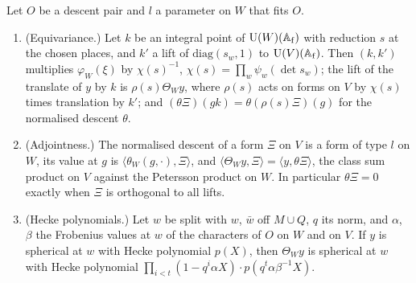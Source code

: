 \begin{proposition}\label{prop:lift-descent}
Let $O$ be a descent pair and $l$ a parameter on $W$ that fits $O$.
\begin{enumerate}[label=\textup{(\alph*)}]
\item (Equivariance.) Let $k$ be an integral point of $\operatorname{U}(W)(\mathbb{A}_{\rm f})$ with reduction $s$ at the chosen places, and $k'$ a lift of $\mathrm{diag}(s_w,1)$ to $\operatorname{U}(V)(\mathbb{A}_{\rm f})$. Then $(k,k')$
multiplies $\varphi_W(\xi)$ by $\chi(s)^{-1}$, $\chi(s)=\prod_w\psi_w(\det s_w)$; the lift of the translate of $y$ by $k$ is $\rho(s)\Theta_Wy$, where $\rho(s)$ acts on forms on $V$ by $\chi(s)$ times
translation by $k'$; and $(\theta\Xi)(gk)=\theta(\rho(s)\Xi)(g)$ for the normalised descent $\theta$.
\item (Adjointness.) The normalised descent of a form $\Xi$ on $V$ is a form of type $l$ on $W$, its value at $g$ is $\langle\theta_W(g,\cdot),\Xi\rangle$, and
$\langle\Theta_Wy,\Xi\rangle=\langle y,\theta\Xi\rangle$, the class sum product on $V$ against the Petersson product on $W$. In particular $\theta\Xi=0$ exactly when $\Xi$ is orthogonal to
all lifts.
\item (Hecke polynomials.) Let $w$ be split with $w$, $\bar w$ off $M\cup Q$, $q$ its norm, and $\alpha$, $\beta$ the Frobenius values at $w$ of the characters of $O$ on $W$ and on $V$. If $y$
is spherical at $w$ with Hecke polynomial $p(X)$, then $\Theta_Wy$ is spherical at $w$ with Hecke polynomial $\prod_{i<t}(1-q^i\alpha X)\cdot p(q^t\alpha\beta^{-1}X)$.
\end{enumerate}
\end{proposition}

